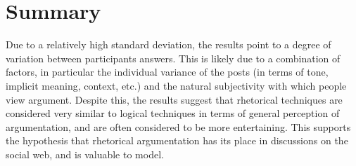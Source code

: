 \section{Summary}
Due to a relatively high standard deviation, the results point to a degree of variation between participants answers. This is likely due to a combination of factors, in particular the individual variance of the posts (in terms of tone, implicit meaning, context, etc.) and the natural subjectivity with which people view argument. Despite this, the results suggest that rhetorical techniques are considered very similar to logical techniques in terms of general perception of argumentation, and are often considered to be more entertaining. This supports the hypothesis that rhetorical argumentation has its place in discussions on the social web, and is valuable to model.
